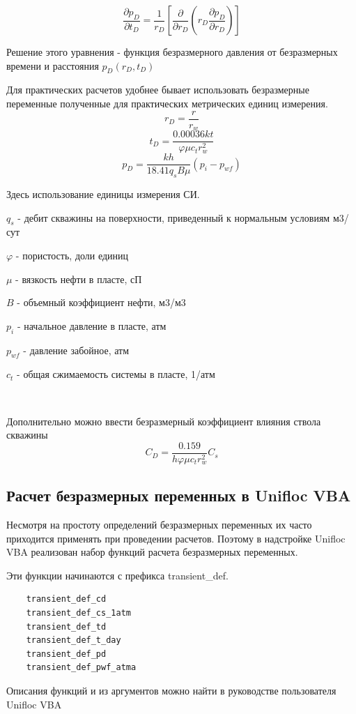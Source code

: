	
$$ 
\frac{\partial p_D}{ \partial t_D} = \dfrac{1}{r_D} \left[ \dfrac{\partial}{\partial r_D} \left( r_D \dfrac{ \partial p_D} {\partial r_D} \right) \right] 
$$

Решение этого уравнения - функция безразмерного давления от безразмерных времени и расстояния $p_D(r_D, t_D) $

Для практических расчетов удобнее бывает использовать безразмерные переменные полученные для практических метрических единиц измерения. 
$$ r_D = \frac{r}{r_w} $$
$$ t_D = \frac{0.00036 kt}{\varphi \mu c_t r_w^2}$$
$$ p_D = \frac{kh}{ 18.41 q_s B \mu} \left( p_i - p_{wf} \right) $$

Здесь использование единицы измерения СИ. 

$q_s$ - дебит скважины на поверхности, приведенный к нормальным условиям м3/сут

$\varphi$ - пористость, доли единиц

$\mu$ - вязкость нефти в пласте, сП

$B$ - объемный коэффициент нефти, м3/м3

$p_i$ - начальное давление в пласте, атм

$p_{wf}$ - давление забойное, атм

$c_t$ - общая сжимаемость системы в пласте, 1/атм

\

Дополнительно можно ввести безразмерный коэффициент влияния ствола скважины
$$ C_D = \frac{0.159}{ h \varphi \mu c_t r_w^2 } C_s $$

\subsection{Расчет безразмерных переменных в Unifloc VBA}

Несмотря на простоту определений безразмерных переменных их часто приходится применять при проведении расчетов. Поэтому в надстройке Unifloc VBA реализован набор функций расчета безразмерных переменных.

Эти функции начинаются с префикса  transient\_def.

\begin{verbatim}
	transient_def_cd
	transient_def_cs_1atm
	transient_def_td
	transient_def_t_day
	transient_def_pd
	transient_def_pwf_atma
\end{verbatim}	

Описания функций и из аргументов можно найти в руководстве пользователя  Unifloc VBA
